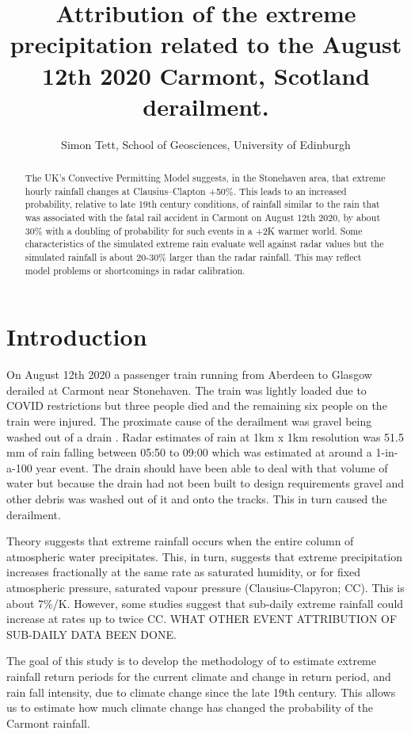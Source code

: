 \documentclass[11pt,a4paper]{article}
\title{Attribution of the  extreme precipitation related to the August 12th 2020 Carmont, Scotland derailment.}
\author{Simon Tett, School of Geosciences, University of Edinburgh}
\begin{document}
\maketitle
\graphicspath{{../figures/}}
\begin{abstract}
	The UK's Convective Permitting Model suggests, in the Stonehaven area, that extreme hourly rainfall changes at Clausius–Clapton +50\%. This leads to an increased probability, relative to late 19th century conditions,  of rainfall similar to the rain that was associated with the fatal rail accident in Carmont on August 12th 2020, by about 30\% with a doubling of probability for such events in a +2K warmer world. Some characteristics of the simulated extreme rain evaluate well against radar values but the  simulated rainfall is about 20-30\% larger than the radar rainfall. This may reflect model problems or shortcomings in  radar  calibration. 
\end{abstract}

\section{Introduction}

On August 12th 2020 a passenger train running from Aberdeen to Glasgow derailed at Carmont near Stonehaven. The train was lightly loaded due to COVID restrictions but three people died and the remaining six people on the train  were injured. The proximate cause of the derailment was gravel being washed out of a drain \parencite{carmontReport2024}. Radar estimates of  rain at 1km x 1km resolution was 51.5 mm of rain falling between 05:50 to 09:00 which was estimated at around a 1-in-a-100 year event. The drain should have been able to deal with that volume of water but because the drain had not been built to design requirements gravel and other debris was washed out of it and onto the tracks. This in turn caused the derailment.

Theory\parencite{allen02insight} suggests that extreme rainfall occurs when the entire column of atmospheric water precipitates. This, in turn,  suggests that extreme precipitation increases fractionally at the same rate as saturated humidity, or for fixed atmospheric pressure, saturated vapour pressure (Clausius-Clapyron; CC). This is about 7\%/K. However, some studies suggest that sub-daily extreme rainfall  could increase  at rates  up to twice CC\parencite{Kendon_Fischer_Short_2023}. WHAT OTHER EVENT ATTRIBUTION OF SUB-DAILY DATA BEEN DONE.

 The goal of this study is to develop the methodology of  \textcite{tett2023edinburgh}  to estimate extreme rainfall return periods for the current climate and change in return period, and rain fall intensity, due to climate change since the late 19th century. This allows us to estimate how much climate change has changed the probability of the Carmont rainfall.
 
\end{document}
